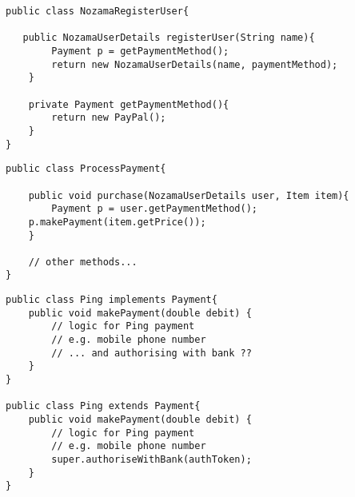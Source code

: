 \documentclass{beamer}
\begin{document}
\begin{frame}[fragile]
\begin{block}{}
\begin{lstlisting}
public class NozamaRegisterUser{
    
   public NozamaUserDetails registerUser(String name){
        Payment p = getPaymentMethod();
        return new NozamaUserDetails(name, paymentMethod);
    }
    
    private Payment getPaymentMethod(){
    	return new PayPal();
    }
}
\end{lstlisting}
\end{block}
\end{frame}

\begin{frame}[fragile]
\begin{block}{}
\begin{lstlisting}
public class ProcessPayment{
       
    public void purchase(NozamaUserDetails user, Item item){
    	Payment p = user.getPaymentMethod();
	p.makePayment(item.getPrice());
    }
    
    // other methods...
}
\end{lstlisting}
\end{block}
\end{frame}

\begin{frame}[fragile]
\begin{block}{}
\begin{lstlisting}
public class Ping implements Payment{
    public void makePayment(double debit) {
        // logic for Ping payment
        // e.g. mobile phone number
        // ... and authorising with bank ?? 
    }
}

public class Ping extends Payment{
    public void makePayment(double debit) {
        // logic for Ping payment
        // e.g. mobile phone number
        super.authoriseWithBank(authToken);
    }
}
\end{lstlisting}
\end{block}
\end{frame}
\end{document}
